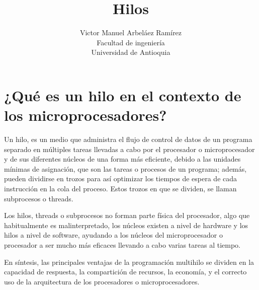 \documentclass[12pt, letter]{article}
\title{\huge{Hilos}}
\author{Victor Manuel Arbeláez Ramírez \\ Facultad de ingeniería \\ Universidad de Antioquia}
\date{}
\begin{document}
\raggedright

\maketitle

\section*{¿Qué es un hilo en el contexto de los microprocesadores?}

\setlength{\parindent}{31pt}
Un hilo, es un medio que administra el flujo de control de datos de un programa separado en múltiples tareas llevadas a cabo por el procesador o microprocesador y de sus diferentes núcleos de una forma más eficiente, debido a las unidades mínimas de asignación, que son las tareas o procesos de un programa; además, pueden dividirse en trozos para así optimizar los tiempos de espera de cada instrucción en la cola del proceso. Estos trozos en que se dividen, se llaman subprocesos o threads.

\setlength{\parindent}{31pt}
Los hilos, threads o subprocesos no forman parte física del procesador, algo que habitualmente es malinterpretado, los núcleos existen a nivel de hardware y los hilos a nivel de software, ayudando a los núcleos del microprocesador o procesador a ser mucho más eficaces llevando a cabo varias tareas al tiempo.

\setlength{\parindent}{31pt}
En síntesis, las principales ventajas de la programación multihilo se dividen en la capacidad de respuesta, la compartición de recursos, la economía, y el correcto uso de la arquitectura de los procesadores o microprocesadores.
\end{document}
